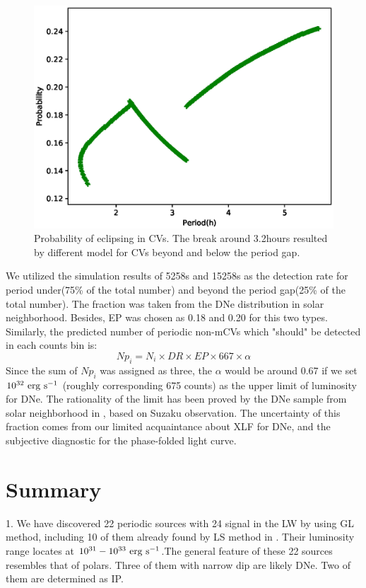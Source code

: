 \documentclass[twoside,twocolumn]{aastex63}
\begin{document}
\begin{figure}[ht!]
\centering
\includegraphics[scale=0.55]{./figure/p_inCV.eps}
\caption{Probability of eclipsing in CVs. The break around 3.2hours resulted by different model for CVs beyond and below the period gap.\label{fig:simpCV}}
\end{figure}
We utilized the simulation results of 5258s and 15258s as the detection rate for period under(75\% of the total number) and beyond the period gap(25\% of the total number). The fraction was taken from the DNe distribution in solar neighborhood. Besides, EP was chosen as 0.18 and 0.20 for this two types.
Similarly, the predicted number of periodic non-mCVs which "should" be detected in each counts bin is:
\begin{equation}
Np_{i}=N_i\times DR \times EP \times 667 \times \alpha	
\end{equation}
Since the sum of $Np_{i}$ was assigned as three, the $\alpha$ would be around 0.67 if we set $\rm 10^{32}~erg~s^{-1}$ (roughly corresponding 675 counts) as the upper limit of luminosity for DNe. The rationality of the limit has been proved by the DNe sample from solar neighborhood in \citep{2016ApJ...818..136X}, based on Suzaku observation. The uncertainty of this fraction comes from our limited acquaintance about XLF for DNe, and the subjective diagnostic for the phase-folded light curve. 
\section{Summary}\label{sec:summary}

1. We have discovered 22 periodic sources with 24 signal in the LW by using GL method, including 10 of them already found by LS method in \cite{2012ApJ...746..165H}. Their luminosity range locates at $\rm 10^{31}-10^{33}~erg~s^{-1} $.The general feature of these 22 sources resembles that of polars. Three of them with narrow dip are likely DNe. Two of them are determined as IP.
\end{document}
